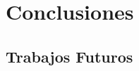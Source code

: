 \chapter{Conclusiones}
\label{chap:conclusion}

\section{Trabajos Futuros} %
\label{sec:trabajos_futuros}

